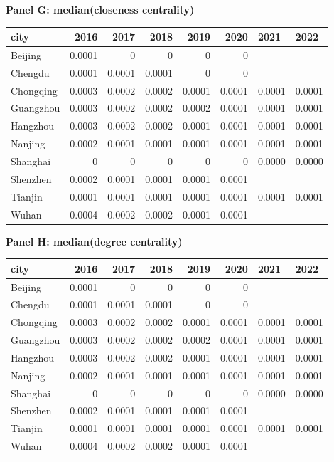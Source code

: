 \textbf{Panel G: median(closeness centrality)}\\
\begin{tabular}{lrrrrrll}
\hline
 city      &   2016 &   2017 &   2018 &   2019 &   2020 & 2021   & 2022   \\
\hline
 Beijing   & 0.0001 & 0      & 0      & 0      & 0      &        &        \\
 Chengdu   & 0.0001 & 0.0001 & 0.0001 & 0      & 0      &        &        \\
 Chongqing & 0.0003 & 0.0002 & 0.0002 & 0.0001 & 0.0001 & 0.0001 & 0.0001 \\
 Guangzhou & 0.0003 & 0.0002 & 0.0002 & 0.0002 & 0.0001 & 0.0001 & 0.0001 \\
 Hangzhou  & 0.0003 & 0.0002 & 0.0002 & 0.0001 & 0.0001 & 0.0001 & 0.0001 \\
 Nanjing   & 0.0002 & 0.0001 & 0.0001 & 0.0001 & 0.0001 & 0.0001 & 0.0001 \\
 Shanghai  & 0      & 0      & 0      & 0      & 0      & 0.0000 & 0.0000 \\
 Shenzhen  & 0.0002 & 0.0001 & 0.0001 & 0.0001 & 0.0001 &        &        \\
 Tianjin   & 0.0001 & 0.0001 & 0.0001 & 0.0001 & 0.0001 & 0.0001 & 0.0001 \\
 Wuhan     & 0.0004 & 0.0002 & 0.0002 & 0.0001 & 0.0001 &        &        \\
\hline
\end{tabular}

\textbf{Panel H: median(degree centrality)}\\
\begin{tabular}{lrrrrrll}
\hline
 city      &   2016 &   2017 &   2018 &   2019 &   2020 & 2021   & 2022   \\
\hline
 Beijing   & 0.0001 & 0      & 0      & 0      & 0      &        &        \\
 Chengdu   & 0.0001 & 0.0001 & 0.0001 & 0      & 0      &        &        \\
 Chongqing & 0.0003 & 0.0002 & 0.0002 & 0.0001 & 0.0001 & 0.0001 & 0.0001 \\
 Guangzhou & 0.0003 & 0.0002 & 0.0002 & 0.0002 & 0.0001 & 0.0001 & 0.0001 \\
 Hangzhou  & 0.0003 & 0.0002 & 0.0002 & 0.0001 & 0.0001 & 0.0001 & 0.0001 \\
 Nanjing   & 0.0002 & 0.0001 & 0.0001 & 0.0001 & 0.0001 & 0.0001 & 0.0001 \\
 Shanghai  & 0      & 0      & 0      & 0      & 0      & 0.0000 & 0.0000 \\
 Shenzhen  & 0.0002 & 0.0001 & 0.0001 & 0.0001 & 0.0001 &        &        \\
 Tianjin   & 0.0001 & 0.0001 & 0.0001 & 0.0001 & 0.0001 & 0.0001 & 0.0001 \\
 Wuhan     & 0.0004 & 0.0002 & 0.0002 & 0.0001 & 0.0001 &        &        \\
\hline
\end{tabular}

